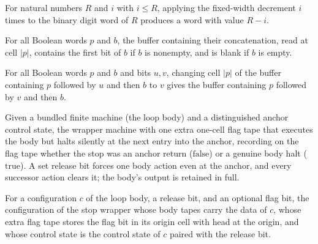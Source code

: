 \begin{lemma}
\label{Turing.FinTM.loopDebit_iterate_value}
\leanok
{}
For natural numbers $R$ and $i$ with $i \le R$, applying the fixed-width decrement $i$
times to the binary digit word of $R$ produces a word with value $R-i$.
\end{lemma}

\begin{lemma}
\label{Turing.FinTM.loopBuffer_read}
\leanok
{}
For all Boolean words $p$ and $b$, the buffer containing their concatenation, read at
cell $|p|$, contains the first bit of $b$ if $b$ is nonempty, and is blank if $b$ is
empty.
\end{lemma}

\begin{lemma}
\label{Turing.FinTM.loopBuffer_write}
\leanok
{}
For all Boolean words $p$ and $b$ and bits $u,v$, changing cell $|p|$ of the buffer
containing $p$ followed by $u$ and then $b$ to $v$ gives the buffer containing $p$
followed by $v$ and then $b$.
\end{lemma}

\begin{definition}
\label{Turing.FinTM.loopBodyTM}
\leanok
{}
Given a bundled finite machine (the loop body) and a distinguished anchor control state,
the wrapper machine with one extra one-cell flag tape that executes the body but halts
silently at the next entry into the anchor, recording on the flag tape whether the stop
was an anchor return ($\mathrm{false}$) or a genuine body halt ($\mathrm{true}$). A set
release bit forces one body action even at the anchor, and every successor action clears
it; the body's output is retained in full.
\end{definition}

\begin{definition}
\label{Turing.FinTM.loopBodyCfg}
\leanok
{}
For a configuration $c$ of the loop body, a release bit, and an optional flag bit, the
configuration of the stop wrapper whose body tapes carry the data of $c$, whose extra
flag tape stores the flag bit in its origin cell with head at the origin, and whose
control state is the control state of $c$ paired with the release bit.
\end{definition}

